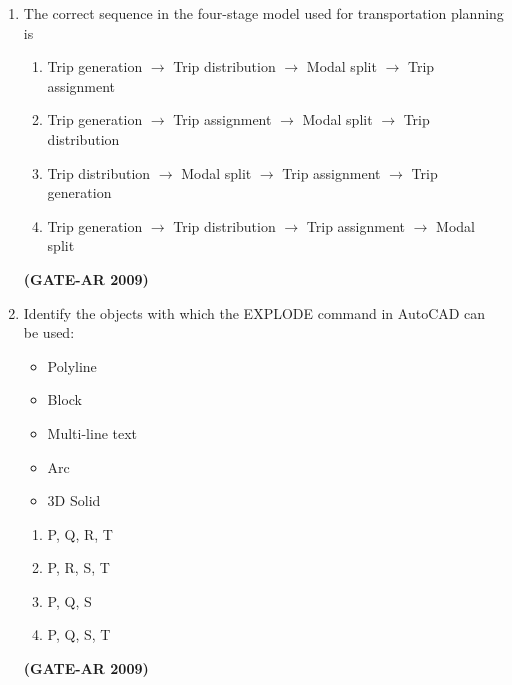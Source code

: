 \documentclass[a4paper,10pt]{article}
\begin{document}
\begin{enumerate}
    \item The correct sequence in the four-stage model used for transportation planning is 
    \begin{enumerate}
        \item Trip generation $\to$ Trip distribution $\to$ Modal split $\to$ Trip assignment
        \item Trip generation $\to$ Trip assignment $\to$ Modal split $\to$ Trip distribution
        \item Trip distribution $\to$ Modal split $\to$ Trip assignment $\to$ Trip generation
        \item Trip generation $\to$ Trip distribution $\to$ Trip assignment $\to$ Modal split
    \end{enumerate}
    \hfill \textbf{(GATE-AR 2009)}

    \item Identify the objects with which the EXPLODE command in AutoCAD can be used: 
    \begin{itemize}
		\item Polyline
		\item Block
		\item Multi-line text
		\item Arc
		\item 3D Solid
	\end{itemize}
	\begin{multicols}{4}
	\begin{enumerate}
        \item P, Q, R, T
        \item P, R, S, T
        \item P, Q, S
        \item P, Q, S, T
    \end{enumerate}
	\end{multicols}
    \hfill \textbf{(GATE-AR 2009)}


\end{enumerate}
\end{document}
